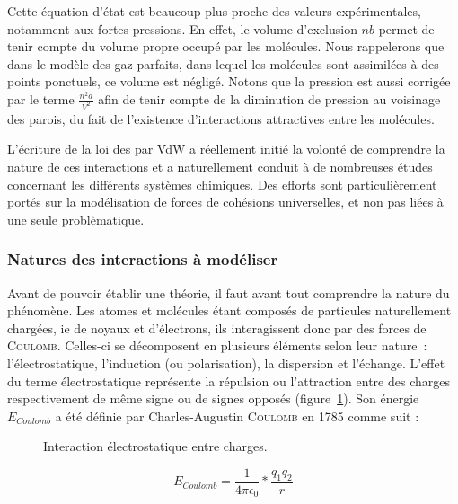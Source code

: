 Cette équation d'état est beaucoup plus proche des valeurs expérimentales, notamment aux fortes pressions. En effet, le volume d'exclusion $nb$ permet de tenir compte du volume propre occupé par les molécules. Nous rappelerons que dans le modèle des gaz parfaits, dans lequel les molécules sont assimilées à des points ponctuels, ce volume est négligé. Notons que la pression est aussi corrigée par le terme $\frac{n^{2}a}{V^{2}}$ afin de tenir compte de la diminution de pression au voisinage des parois, du fait de l'existence d'interactions attractives entre les molécules.

L'écriture de la loi des \og {} par VdW a réellement initié la volonté de comprendre la nature de ces interactions et a naturellement conduit à de nombreuses études concernant les différents systèmes chimiques. Des efforts sont particulièrement portés sur la modélisation de forces de cohésions universelles, et non pas liées à une seule problèmatique.

\subsubsection{Natures des interactions à modéliser}

Avant de pouvoir établir une théorie, il faut avant tout comprendre la nature du phénomène. Les atomes et molécules étant composés de particules naturellement chargées, ie de noyaux et d'électrons, ils interagissent donc par des forces de \textsc{Coulomb}. Celles-ci se décomposent en plusieurs éléments selon leur nature~: l'électrostatique, l'induction (ou polarisation), la dispersion et l'échange.
L'effet du terme électrostatique représente la répulsion ou l'attraction entre des charges respectivement de même signe ou de signes opposés (figure~\ref{chargecharge}). Son énergie $E_{Coulomb}$ a été définie par Charles-Augustin \textsc{Coulomb} en 1785 comme suit :

\begin{figure}[h]
\centering
{}
\caption{Interaction électrostatique entre charges.}
\label{chargecharge}
\end{figure}

\begin{equation}
E_{Coulomb} = \frac{1}{4 \pi \epsilon_{0}} * \frac{q_{1} q_{2}}{r}
\end{equation}

